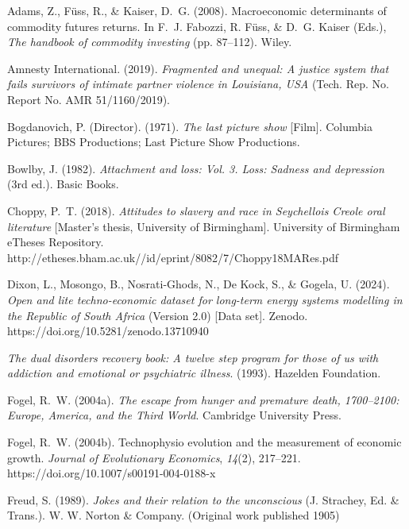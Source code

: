 \documentclass[]{interact}
\theoremstyle{plain}%
\theoremstyle{definition}
\theoremstyle{remark}
\begin{document}
\begin{thebibliography}{}

Adams, Z., F{\"u}ss, R., \& Kaiser, D.~G. (2008). Macroeconomic determinants of commodity
futures returns. In F.~J. Fabozzi, R. F{\"u}ss, \& D.~G. Kaiser (Eds.), \emph{The handbook of commodity
	investing} (pp. 87--112). Wiley.

Amnesty International. (2019). \emph{Fragmented and unequal: A justice system that fails survivors
of intimate partner violence in Louisiana, USA} (Tech. Rep. No. Report No. AMR
51/1160/2019).

Bogdanovich, P. (Director). (1971). \emph{The last picture show} [Film]. Columbia Pictures; BBS
Productions; Last Picture Show Productions.

Bowlby, J. (1982). \emph{Attachment and loss: Vol. 3. Loss: Sadness and depression} (3rd ed.). Basic Books.

Choppy, P.~T. (2018). \emph{Attitudes to slavery and race in Seychellois Creole oral literature}
[Master’s thesis, University of Birmingham]. University of Birmingham eTheses Repository.
http://etheses.bham.ac.uk//id/eprint/8082/7/Choppy18MARes.pdf

Dixon, L., Mosongo, B., Nosrati-Ghods, N., De Kock, S., \& Gogela, U. (2024). \emph{Open and lite
techno-economic dataset for long-term energy systems modelling in the Republic of South
Africa} (Version 2.0) [Data set]. Zenodo. https://doi.org/10.5281/zenodo.13710940

\emph{The dual disorders recovery book: A twelve step program for those of us with addiction and emotional or psychiatric illness}. (1993). Hazelden Foundation.

Fogel, R.~W. (2004a). \emph{The escape from hunger and premature death, 1700--2100: Europe,
America, and the Third World}. Cambridge University Press.

Fogel, R.~W. (2004b). Technophysio evolution and the measurement of economic growth.
\emph{Journal of Evolutionary Economics}, \emph{14}(2), 217--221. https://doi.org/10.1007/s00191-004-0188-x

Freud, S. (1989). \emph{Jokes and their relation to the unconscious} (J. Strachey, Ed. \& Trans.). W.
W. Norton \& Company. (Original work published 1905)


\end{thebibliography}
\end{document}
